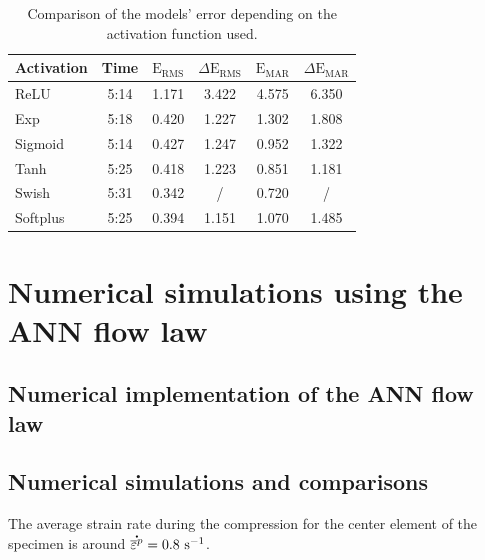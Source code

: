 \documentclass[algorithms,article,submit,pdftex,moreauthors]{Definitions/mdpi}
\DeclareRobustCommand{\mdot}[1]{\accentset{\mbox{\bfseries .}}{#1}}
\DeclareRobustCommand{\RMSE}{\text{E}_\text{RMS}}
\DeclareRobustCommand{\MARE}{\text{E}_\text{MAR}}
\DeclareRobustCommand{\ps}{\text{s}^{-1}}
\begin{document}
\begin{table}[H]
\caption{Comparison of the models' error depending on the activation function used.}
\begin{tabular}{lccccc}
\toprule
Activation & Time & $\RMSE$ & $\Delta\RMSE$ & $\MARE$  & $\Delta\MARE$ \\ \midrule
ReLU & 5:14 & 1.171 & 3.422 & 4.575 & 6.350\\ 
Exp & 5:18 & 0.420 & 1.227 & 1.302 & 1.808\\ 
Sigmoid & 5:14 & 0.427 & 1.247 & 0.952 & 1.322\\ 
Tanh & 5:25 & 0.418 & 1.223 & 0.851 & 1.181\\ 
Swish & 5:31 & 0.342 & / &0.720 & / \\ 
Softplus & 5:25 & 0.394 & 1.151 & 1.070 & 1.485\\
\bottomrule
\end{tabular}
\end{table}


\section{Numerical simulations using the ANN flow law}\label{sec:Numerical}

\subsection{Numerical implementation of the ANN flow law}\label{subsec:Num-impl}

\subsection{Numerical simulations and comparisons}\label{subsec:Num-sim}

The average strain rate during the compression for the center element of the specimen is around $\mdot{\overline{\varepsilon}^p}=0.8~\ps$.
\end{document}
